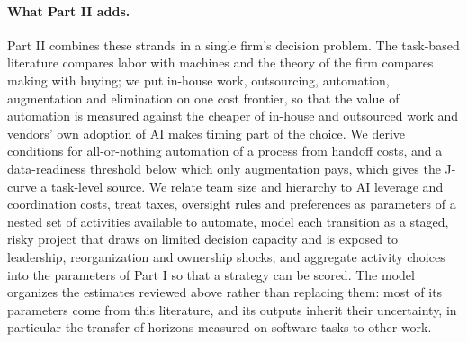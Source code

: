 \paragraph{What Part II adds.} Part II combines these strands in a single firm's decision problem. The task-based literature compares labor with machines and the theory of the firm compares making with buying; we put in-house work, outsourcing, automation, augmentation and elimination on one cost frontier, so that the value of automation is measured against the cheaper of in-house and outsourced work and vendors' own adoption of AI makes timing part of the choice. We derive conditions for all-or-nothing automation of a process from handoff costs, and a data-readiness threshold below which only augmentation pays, which gives the J-curve a task-level source. We relate team size and hierarchy to AI leverage and coordination costs, treat taxes, oversight rules and preferences as parameters of a nested set of activities available to automate, model each transition as a staged, risky project that draws on limited decision capacity and is exposed to leadership, reorganization and ownership shocks, and aggregate activity choices into the parameters of Part I so that a strategy can be scored. The model organizes the estimates reviewed above rather than replacing them: most of its parameters come from this literature, and its outputs inherit their uncertainty, in particular the transfer of horizons measured on software tasks to other work.
